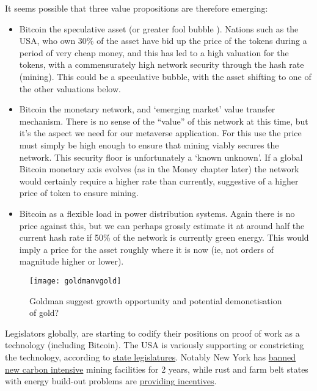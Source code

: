 It seems possible that three value propositions are therefore emerging:
\begin{itemize}
\item Bitcoin the speculative asset (or greater fool bubble \cite{de1990positive}). Nations such as the USA, who own 30\% of the asset have bid up the price of the tokens during a period of very cheap money, and this has led to a high valuation for the tokens, with a commensurately high network security through the hash rate (mining). This could be a speculative bubble, with the asset shifting to one of the other valuations below.
\item Bitcoin the monetary network, and `emerging market' value transfer mechanism. There is no sense of the ``value'' of this network at this time, but it's the aspect we need for our metaverse application. For this use the price must simply be high enough to ensure that mining viably secures the network. This security floor is unfortunately a `known unknown'. If a global Bitcoin monetary axis evolves (as in the Money chapter later) the network would certainly require a higher rate than currently, suggestive of a higher price of token to ensure mining.
\item Bitcoin as a flexible load in power distribution systems. Again there is no price against this, but we can perhaps grossly estimate it at around half the current hash rate if 50\% of the network is currently green energy. This would imply a price for the asset roughly where it is now (ie, not orders of magnitude higher or lower).  
\end{itemize}
\begin{figure}
  \centering
    \texttt{[image: goldmanvgold]}
  \caption{Goldman suggest growth opportunity and potential demonetisation of gold?}
  \label{fig:goldmanVgold}
\end{figure}
Legislators globally, are starting to codify their positions on proof of work as a technology (including Bitcoin). The USA is variously supporting or constricting the technology, according to \href{https://www.ncsl.org/research/financial-services-and-commerce/cryptocurrency-2021-legislation.aspx}{state legislatures}. Notably New York has \href{https://www.nysenate.gov/legislation/bills/2021/A7389}{banned new carbon intensive} mining facilities for 2 years, while rust and farm belt states with energy build-out problems are \href{https://financialpost.com/fp-finance/cryptocurrency/texas-governor-abbott-turns-to-bitcoin-miners-to-bolster-the-grid-and-his-re-election}{providing incentives}. \par
